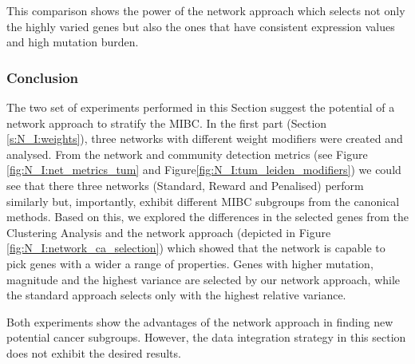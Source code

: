 This comparison shows the power of the network approach which selects not only the highly varied genes but also the ones that have consistent expression values and high mutation burden.

\subsubsection{Conclusion}

The two set of experiments performed in this Section suggest the potential of a network approach to stratify the MIBC. In the first part (Section \ref{s:N_I:weights}), three networks with different weight modifiers were created and analysed. From the network and community detection metrics (see Figure \ref{fig:N_I:net_metrics_tum} and Figure\ref{fig:N_I:tum_leiden_modifiers}) we could see that there three networks (Standard, Reward and Penalised) perform similarly but, importantly, exhibit different MIBC subgroups from the canonical methods. Based on this, we explored the differences in the selected genes from the Clustering Analysis and the network approach (depicted in Figure \ref{fig:N_I:network_ca_selection}) which showed that the network is capable to pick genes with a wider a range of properties. Genes with higher mutation, magnitude and the highest variance are selected by our network approach, while the standard approach selects only with the highest relative variance.

Both experiments show the advantages of the network approach in finding new potential cancer subgroups. However, the data integration strategy in this section does not exhibit the desired results.


